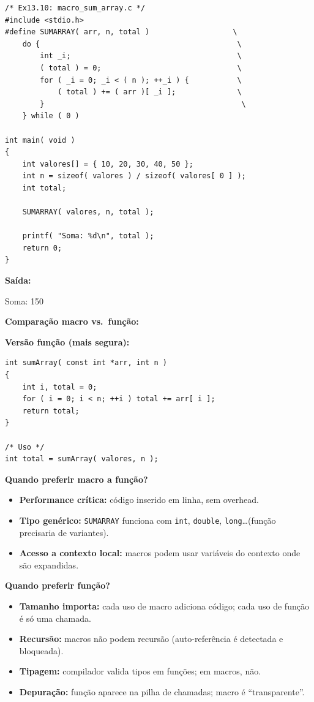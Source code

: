 \documentclass[12pt,a4paper]{article}
\begin{document}
\begin{respostabox}
\begin{lstlisting}
/* Ex13.10: macro_sum_array.c */
#include <stdio.h>
#define SUMARRAY( arr, n, total )                   \
    do {                                             \
        int _i;                                      \
        ( total ) = 0;                               \
        for ( _i = 0; _i < ( n ); ++_i ) {           \
            ( total ) += ( arr )[ _i ];              \
        }                                             \
    } while ( 0 )

int main( void )
{
    int valores[] = { 10, 20, 30, 40, 50 };
    int n = sizeof( valores ) / sizeof( valores[ 0 ] );
    int total;

    SUMARRAY( valores, n, total );

    printf( "Soma: %d\n", total );
    return 0;
}
\end{lstlisting}

\textbf{Saída:}
\begin{saida}
Soma: 150
\end{saida}

\textbf{Comparação macro vs.\ função:}

\textbf{Versão função (mais segura):}
\begin{lstlisting}
int sumArray( const int *arr, int n )
{
    int i, total = 0;
    for ( i = 0; i < n; ++i ) total += arr[ i ];
    return total;
}

/* Uso */
int total = sumArray( valores, n );
\end{lstlisting}

\textbf{Quando preferir macro a função?}
\begin{itemize}[noitemsep]
  \item \textbf{Performance crítica:} código inserido em linha, sem overhead.
  \item \textbf{Tipo genérico:} \texttt{SUMARRAY} funciona com \texttt{int},
  \texttt{double}, \texttt{long}\ldots (função precisaria de variantes).
  \item \textbf{Acesso a contexto local:} macros podem usar variáveis do
  contexto onde são expandidas.
\end{itemize}

\textbf{Quando preferir função?}
\begin{itemize}[noitemsep]
  \item \textbf{Tamanho importa:} cada uso de macro adiciona código; cada uso
  de função é só uma chamada.
  \item \textbf{Recursão:} macros não podem recursão (auto-referência é
  detectada e bloqueada).
  \item \textbf{Tipagem:} compilador valida tipos em funções; em macros, não.
  \item \textbf{Depuração:} função aparece na pilha de chamadas; macro é
  ``transparente''.
\end{itemize}


\end{respostabox}
\end{document}
